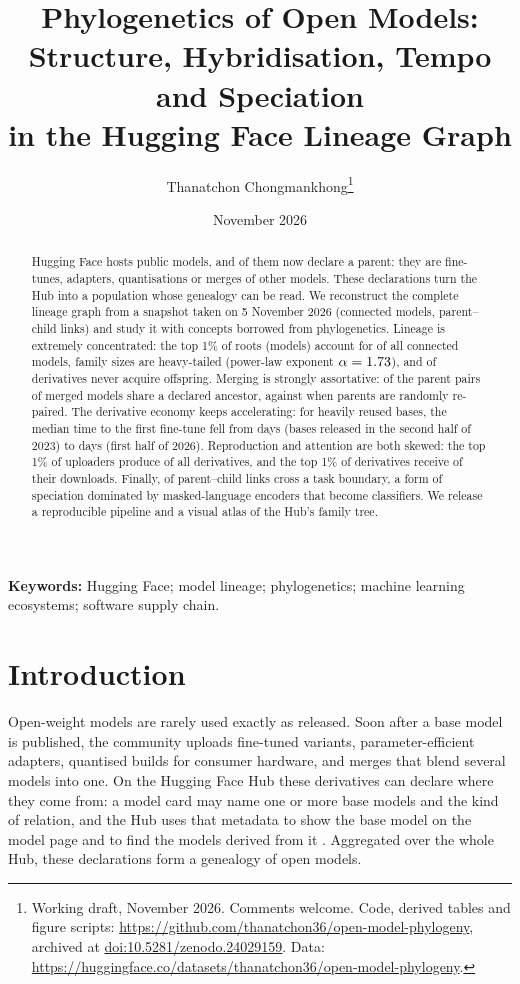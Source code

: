 \documentclass[11pt]{article}
\title{\LARGE\bfseries Phylogenetics of Open Models:\\[0.15em] Structure, Hybridisation, Tempo and Speciation\\[0.15em] in the Hugging Face Lineage Graph}
\author{\large Thanatchon Chongmankhong\thanks{Working draft, November 2026. Comments welcome. Code, derived tables and figure scripts: \url{https://github.com/thanatchon36/open-model-phylogeny}, archived at \href{https://doi.org/10.5281/zenodo.24029159}{doi:10.5281/zenodo.24029159}. Data: \url{https://huggingface.co/datasets/thanatchon36/open-model-phylogeny}.}}
\date{\normalsize November 2026}
\begin{document}
\maketitle
\thispagestyle{plain}

\begin{abstract}
Hugging Face hosts \nModelsHub public models, and \pctDeclare of them now declare a parent: they are fine-tunes, adapters, quantisations or merges of other models. These declarations turn the Hub into a population whose genealogy can be read. We reconstruct the complete lineage graph from a snapshot taken on 5 November 2026 (\nConnected connected models, \nEdges parent--child links) and study it with concepts borrowed from phylogenetics. Lineage is extremely concentrated: the top 1\% of roots (\nTopOnePctRoots models) account for \pctTopOnePctRoots of all connected models, family sizes are heavy-tailed (power-law exponent $\alpha=1.73$), and \pctLeaves of derivatives never acquire offspring. Merging is strongly assortative: \pctRelated of the parent pairs of merged models share a declared ancestor, against \pctNullRelated when parents are randomly re-paired. The derivative economy keeps accelerating: for heavily reused bases, the median time to the first fine-tune fell from \rtFinetuneEarly days (bases released in the second half of 2023) to \rtFinetuneLate days (first half of 2026). Reproduction and attention are both skewed: the top 1\% of uploaders produce \pctTopUploaders of all derivatives, and the top 1\% of derivatives receive \pctTopDownloads of their downloads. Finally, \pctSpeciation of parent--child links cross a task boundary, a form of speciation dominated by masked-language encoders that become classifiers. We release a reproducible pipeline and a visual atlas of the Hub's family tree.
\end{abstract}

\noindent\textbf{Keywords:} Hugging Face; model lineage; phylogenetics; machine learning ecosystems; software supply chain.

\section{Introduction}
Open-weight models are rarely used exactly as released. Soon after a base model is published, the community uploads fine-tuned variants, parameter-efficient adapters, quantised builds for consumer hardware, and merges that blend several models into one. On the Hugging Face Hub these derivatives can declare where they come from: a model card may name one or more base models and the kind of relation, and the Hub uses that metadata to show the base model on the model page and to find the models derived from it \citep{hfdocs}. Aggregated over the whole Hub, these declarations form a genealogy of open models.
\end{document}
